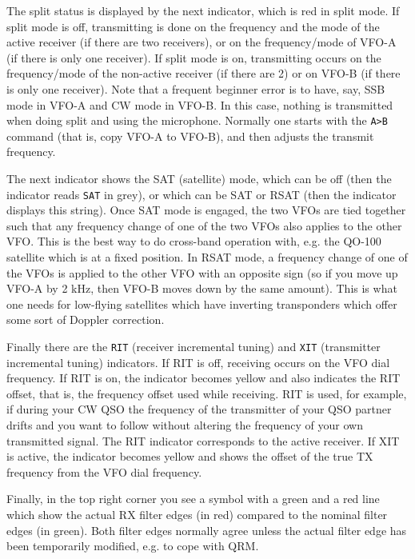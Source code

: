 \documentclass[12pt]{book}
\def\rett#1{\texttt{\color{red}#1}}
\def\bltt#1{\texttt{\color{blue}#1}}
\begin{document}
The split status is displayed by the next indicator, which is red in
split mode. If split mode is off, transmitting is done on the frequency
and the mode of the active receiver (if there are two receivers), or
on the frequency/mode of VFO-A (if there is only one receiver). If
split mode is on, transmitting occurs on the frequency/mode of the
non-active receiver (if there are 2) or on VFO-B (if there is only  one
receiver). Note that a frequent beginner error is to have, say,
SSB mode in VFO-A and CW mode in VFO-B. In this case, nothing is
transmitted when doing split and using the microphone. Normally one
starts with the \bltt{A>B} command (that is, copy VFO-A to VFO-B), and
then adjusts the transmit frequency.

The next indicator shows the SAT (satellite) mode, which can be off
(then the indicator reads \rett{SAT} in grey), or which can be SAT or RSAT
(then the indicator displays this string). Once SAT mode is engaged,
the two VFOs are tied together such that any frequency change of one
of the two VFOs also applies to the other VFO. This is the best way
to do cross-band operation with, e.g. the QO-100 satellite which is at
a fixed position. In RSAT mode, a frequency change of one of the VFOs
is applied to the other VFO with an opposite sign (so if you move up
VFO-A by 2 kHz, then VFO-B moves down by the same amount). This is
what one needs for low-flying satellites which have inverting
transponders which offer some sort of Doppler correction.

Finally there are the \rett{RIT} (receiver incremental tuning) and \rett{XIT}
(transmitter incremental tuning) indicators. If RIT is off,
receiving occurs on the VFO dial frequency. If RIT is on, the
indicator becomes yellow and also indicates the RIT offset, that is,
the frequency offset used while receiving. RIT is used, for example,
if during your CW QSO the frequency of the transmitter of your
QSO partner drifts and you want to follow without altering the
frequency of your own transmitted signal. The RIT indicator
corresponds to the active receiver. If XIT is active, the
indicator becomes yellow and shows the offset of the true
TX frequency from the VFO dial frequency.

Finally, in the top right corner you see a symbol with a green and a red line
which show the actual RX filter edges (in red) compared to the nominal
filter edges (in green). Both filter edges normally agree unless the actual
filter edge has been temporarily modified, e.g. to cope with QRM.
\end{document}
